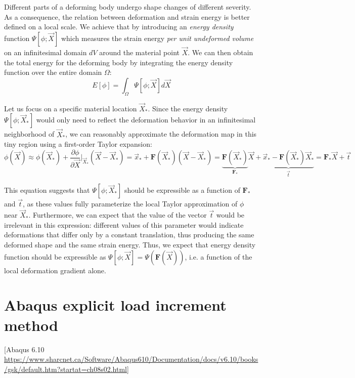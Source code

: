 Different parts of a deforming body undergo shape changes of different severity. As a consequence, the relation between deformation and strain energy is better defined on a local scale. We achieve that by introducing an \textit{energy density} function $ \Psi [\phi; \vec{X}] $ which measures the strain energy \textit{per unit undeformed volume} on an infinitesimal domain $ dV $ around the material point $ \vec{X} $. We can then obtain the total energy for the deforming body by integrating the energy density function over the entire domain $ \Omega $:
\begin{equation*}
	E[\phi] = \int_{\Omega}{\Psi[\phi;\vec{X}]d\vec{X}}
\end{equation*}

Let us focus on a specific material location $ \vec{X}_* $. Since the energy density $ \Psi[\phi ; \vec{X}_*] $ would only need to reflect the deformation behavior in an infinitesimal neighborhood of $ \vec{X}_* $, we can reasonably approximate the deformation map in this tiny region using a first-order Taylor expansion:
\begin{equation*}
	\phi (\vec{X}) \approx \phi (\vec{X}_*) + \dfrac{\partial \phi}{\partial \vec{X}}\biggr\rvert_{\vec{X}_*}(\vec{X}-\vec{X}_*) = \vec{x}_*+\mathbf{F}(\vec{X}_*)(\vec{X}-\vec{X}_*)= \underbrace{\mathbf{F} (\vec{X}_*)}_{\mathbf{F}_*}\vec{X}+ \underbrace{\vec{x}_*-\mathbf{F}(\vec{X}_*)\vec{X}_*}_{\vec{t}}= \mathbf{F}_*\vec{X}+\vec{t}
\end{equation*}

This equation suggests that $ \Psi[\phi;\vec{X}_*] $ should be expressible as a function of $ \mathbf{F}_* $ and $ \vec{t} $, as these values fully parameterize the local Taylor approximation of $ \phi $ near $ \vec{X}_* $. Furthermore, we can expect that the value of the vector $ \vec{t} $ would be irrelevant in this expression: different values of this parameter would indicate deformations that differ only by a constant translation, thus producing the same deformed shape and the same strain energy. Thus, we expect that energy density function should be expressible as $ \Psi[\phi;\vec{X}] = \Psi (\mathbf{F} (\vec{X})) $, i.e. a function of the local deformation gradient alone.

\section{Abaqus explicit load increment method}
[Abaqus 6.10 \url{https://www.sharcnet.ca/Software/Abaqus610/Documentation/docs/v6.10/books/gsk/default.htm?startat=ch08s02.html}]

